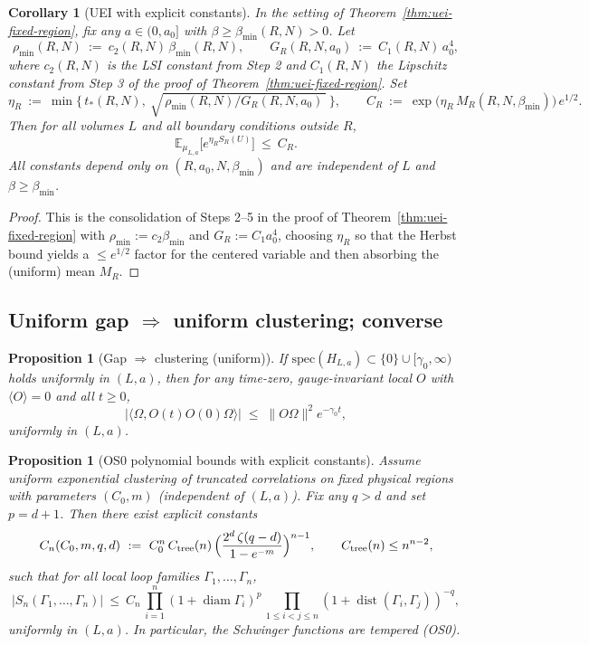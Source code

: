 \documentclass[11pt]{amsart}
\theoremstyle{plain}
\newtheorem{proposition}[theorem]{Proposition}
\newtheorem{corollary}[theorem]{Corollary}
\theoremstyle{definition}
\theoremstyle{remark}
\begin{document}
\begin{corollary}[UEI with explicit constants]\label{cor:uei-explicit-constants}
In the setting of Theorem~\ref{thm:uei-fixed-region}, fix any $a\in(0,a_0]$ with $\beta\ge \beta_{\min}(R,N)>0$. Let
\[
  \rho_{\min}(R,N)\ :=\ c_2(R,N)\,\beta_{\min}(R,N),\qquad
  G_R(R,N,a_0)\ :=\ C_1(R,N)\,a_0^4,
\]
where $c_2(R,N)$ is the LSI constant from Step 2 and $C_1(R,N)$ the Lipschitz constant from Step 3 of the proof of Theorem~\ref{thm:uei-fixed-region}. Set
\[
  \eta_R\ :=\ \min\Big\{\,t_*(R,N),\ \sqrt{\,\rho_{\min}(R,N)\big/ G_R(R,N,a_0)\,}\ \Big\},\qquad
  C_R\ :=\ \exp\big(\eta_R\,M_R(R,N,\beta_{\min})\big)\,e^{1/2}.
\]
Then for all volumes $L$ and all boundary conditions outside $R$,
\[
  \mathbb{E}_{\mu_{L,a}}\big[e^{\eta_R S_R(U)}\big]\ \le\ C_R.
\]
All constants depend only on $(R,a_0,N,\beta_{\min})$ and are independent of $L$ and $\beta\ge \beta_{\min}$.
\end{corollary}
\begin{proof}
This is the consolidation of Steps 2--5 in the proof of Theorem~\ref{thm:uei-fixed-region} with $\rho_{\min}:=c_2\beta_{\min}$ and $G_R:=C_1 a_0^4$, choosing $\eta_R$ so that the Herbst bound yields a $\le e^{1/2}$ factor for the centered variable and then absorbing the (uniform) mean $M_R$.
\end{proof}

\subsection*{Uniform gap $\Rightarrow$ uniform clustering; converse}

\begin{proposition}[Gap $\Rightarrow$ clustering (uniform)]\label{prop:gap-to-cluster}
If $\mathrm{spec}(H_{L,a})\subset\{0\}\cup[\gamma_0,\infty)$ holds uniformly in $(L,a)$, then for any time-zero, gauge-invariant local $O$ with $\langle O\rangle=0$ and all $t\ge 0$,
\[
  |\langle\Omega, O(t)O(0)\Omega\rangle|\;\le\;\|O\Omega\|^2 e^{-\gamma_0 t},
\]
uniformly in $(L,a)$.
\end{proposition}

\begin{proposition}[OS0 polynomial bounds with explicit constants]\label{prop:OS0-poly}
Assume uniform exponential clustering of truncated correlations on fixed physical regions with parameters $(C_0,m)$ (independent of $(L,a)$). Fix any $q>d$ and set $p=d+1$. Then there exist explicit constants
\[
  C_n(C_0,m,q,d)\ :=\ C_0^n\,C_{\mathrm{tree}}(n)\,\Bigl(\frac{2^d\,\zeta(q-d)}{1-e^{-m}}\Bigr)^{n-1},\qquad C_{\mathrm{tree}}(n)\le n^{n-2},
\]
such that for all local loop families $\Gamma_1,\dots,\Gamma_n$,
\[
  |S_n(\Gamma_1,\dots,\Gamma_n)|\ \le\ C_n\,\prod_{i=1}^n (1+\operatorname{diam}\Gamma_i)^p\,\prod_{1\le i<j\le n} (1+\operatorname{dist}(\Gamma_i,\Gamma_j))^{-q},
\]
uniformly in $(L,a)$. In particular, the Schwinger functions are tempered (OS0).
\end{proposition}
\end{document}

